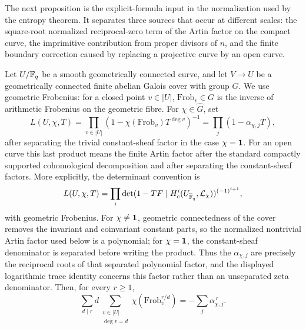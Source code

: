 The next proposition is the explicit-formula input in the normalization used by
the entropy theorem.  It separates three sources that occur at different
scales: the square-root normalized reciprocal-zero term of the Artin factor on
the compact curve, the imprimitive contribution from proper divisors of \(n\),
and the finite boundary correction caused by replacing a projective curve by an
open curve.

\begin{lemma}\label{lem:artin-euler-trace-convention}
Let \(U/\mathbb{F}_q\) be a smooth geometrically connected curve, and let
\(V\to U\) be a geometrically connected finite \etale{} abelian Galois cover
with group \(G\).  We use geometric Frobenius: for a closed point
\(v\in |U|\), \(\mathrm{Frob}_v\in G\) is the inverse of arithmetic Frobenius
on the geometric fibre.  For \(\chi\in\widehat G\), set
\[
L(U,\chi,T)
=
\prod_{v\in |U|}
\left(1-\chi(\mathrm{Frob}_v)T^{\deg v}\right)^{-1}
=
\prod_j(1-\alpha_{\chi,j}T),
\]
after separating the trivial constant-sheaf factor in the case
\(\chi=\mathbf{1}\).  For an open curve this last product means the finite Artin factor after the
standard compactly supported cohomological decomposition and after separating
the constant-sheaf factors.  More explicitly, the determinant convention is
\[
L(U,\chi,T)=
\prod_i
\det(1-TF\mid H^i_c(U_{\overline{\mathbb{F}}_q},\mathcal L_\chi))^{(-1)^{i+1}},
\]
with geometric Frobenius.  For \(\chi\ne\mathbf{1}\), geometric connectedness of the
cover removes the invariant and coinvariant constant parts, so the normalized
nontrivial Artin factor used below is a polynomial; for \(\chi=\mathbf{1}\), the
constant-sheaf denominator is separated before writing the product.  Thus the
\(\alpha_{\chi,j}\) are precisely the reciprocal roots of that separated
polynomial factor, and the displayed logarithmic trace identity concerns this
factor rather than an unseparated zeta denominator.  Then, for every \(r\ge1\),
\[
\sum_{d\mid r}d\sum_{\substack{v\in |U|\\ \deg v=d}}
\chi\!\left(\mathrm{Frob}_v^{r/d}\right)
=
-\sum_j\alpha_{\chi,j}^{\,r}.
\]
\end{lemma}


